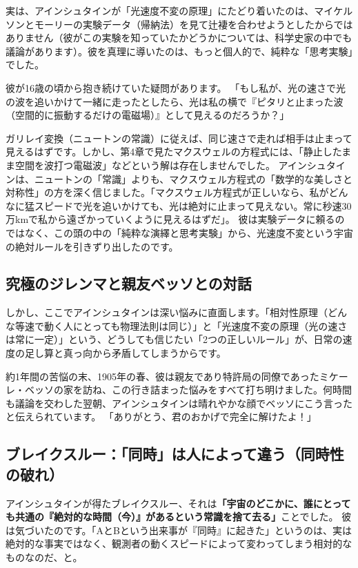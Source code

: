 実は、アインシュタインが「光速度不変の原理」にたどり着いたのは、マイケルソンとモーリーの実験データ（帰納法）を見て辻褄を合わせようとしたからではありません（彼がこの実験を知っていたかどうかについては、科学史家の中でも議論があります）。彼を真理に導いたのは、もっと個人的で、純粋な「思考実験」でした。

彼が16歳の頃から抱き続けていた疑問があります。 「もし私が、光の速さで光の波を追いかけて一緒に走ったとしたら、光は私の横で『ピタリと止まった波（空間的に振動するだけの電磁場）』として見えるのだろうか？」

ガリレイ変換（ニュートンの常識）に従えば、同じ速さで走れば相手は止まって見えるはずです。しかし、第4章で見たマクスウェルの方程式には、「静止したまま空間を波打つ電磁波」などという解は存在しませんでした。 アインシュタインは、ニュートンの「常識」よりも、マクスウェル方程式の「数学的な美しさと対称性」の方を深く信じました。「マクスウェル方程式が正しいなら、私がどんなに猛スピードで光を追いかけても、光は絶対に止まって見えない。常に秒速30万kmで私から遠ざかっていくように見えるはずだ」。 彼は実験データに頼るのではなく、この頭の中の「純粋な演繹と思考実験」から、光速度不変という宇宙の絶対ルールを引きずり出したのです。

\subsection{究極のジレンマと親友ベッソとの対話}

しかし、ここでアインシュタインは深い悩みに直面します。「相対性原理（どんな等速で動く人にとっても物理法則は同じ）」と「光速度不変の原理（光の速さは常に一定）」という、どうしても信じたい「2つの正しいルール」が、日常の速度の足し算と真っ向から矛盾してしまうからです。

約1年間の苦悩の末、1905年の春、彼は親友であり特許局の同僚であったミケーレ・ベッソの家を訪ね、この行き詰まった悩みをすべて打ち明けました。何時間も議論を交わした翌朝、アインシュタインは晴れやかな顔でベッソにこう言ったと伝えられています。 「ありがとう、君のおかげで完全に解けたよ！」

\subsection{ブレイクスルー：「同時」は人によって違う（同時性の破れ）}

アインシュタインが得たブレイクスルー、それは\textbf{「宇宙のどこかに、誰にとっても共通の『絶対的な時間（今）』があるという常識を捨て去る」}ことでした。 彼は気づいたのです。「AとBという出来事が『同時』に起きた」というのは、実は絶対的な事実ではなく、観測者の動くスピードによって変わってしまう相対的なものなのだ、と。

